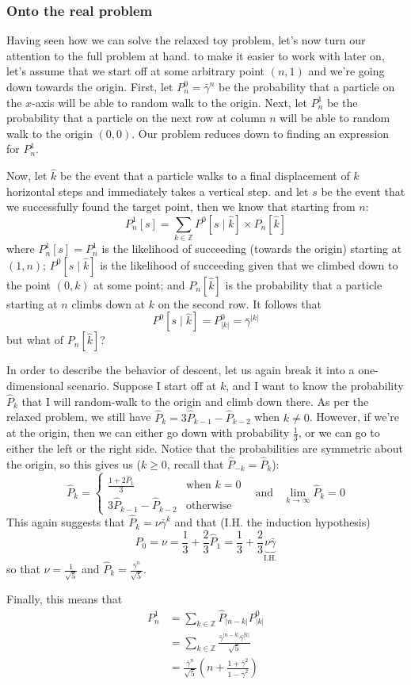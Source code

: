 \subsubsection{Onto the real problem}

Having seen how we can solve the relaxed toy problem, let's now turn our attention to the full problem at hand. to make it easier to work with later on, let's assume that we start off at some arbitrary point $(n,1)$ and we're going down towards the origin. First, let $P^{0}_n = \bar\gamma^n$ be the probability that a particle on the $x$-axis will be able to random walk to the origin. Next, let $P^{1}_n$ be the probability that a particle on the next row at column $n$ will be able to random walk to the origin $(0,0)$. Our problem reduces down to finding an expression for $P^1_n$.


Now, let $\hat k$ be the event that a particle walks to a final displacement of $k$ horizontal steps and immediately takes a vertical step. and let $s$ be the event that we successfully found the target point, then we know that starting from $n$:
$$
P^1_n[s] = \sum_{k \in \mathbb{Z}} P^0[s \mid \hat k] \times P_n[\hat k]
$$
where $P^1_n[s] = P^1_n$ is the likelihood of succeeding (towards the origin) starting at $(1,n)$; $P^0[s \mid \hat k]$ is the likelihood of succeeding given that we climbed down to the point $(0,k)$ at some point; and $P_n[\hat k]$ is the probability that a particle starting at $n$ climbs down at $k$ on the second row. It follows that
$$
P^0[s \mid \hat k] = P^0_{|k|} = \bar\gamma^{|k|}
$$
but what of $P_n[\hat k]$?

In order to describe the behavior of descent, let us again break it into a one-dimensional scenario. Suppose I start off at $k$, and I want to know the probability $\hat P_k$ that I will random-walk to the origin and climb down there. As per the relaxed problem, we still have $\hat P_k = 3 \hat P_{k-1} - \hat P_{k-2}$ when $k \ne 0$. However, if we're at the origin, then we can either go down with probability $\frac13$, or we can go to either the left or the right side. Notice that the probabilities are symmetric about the origin, so this gives us ($k \ge 0$, recall that $\hat P_{-k} = \hat P_k$):
$$
\hat P_k = \begin{cases}
\frac{1 + 2\hat P_1}{3} & \text{when }k = 0 \\
3 \hat P_{k-1} - \hat P_{k-2} & \text{otherwise}
\end{cases} ~~~~ \text{and} ~~~~ \lim_{k\to\infty} \hat P_k = 0
$$
This again suggests that $\hat P_k = \nu \bar\gamma^k$ and that (I.H. the induction hypothesis)
$$
P_0 = \nu = \frac13 + \frac23\hat P_1 = \frac13 + \frac23\underbrace{\nu \bar\gamma}_{\text{I.H.}}
$$
so that $\nu = \frac1{\sqrt{5}}$ and $\hat P_k = \frac{\bar\gamma^n}{\sqrt{5}}$.

Finally, this means that
\begin{align*}
P^1_n &= \sum_{k\in\mathbb{Z}} \hat P_{|n-k|} P^0_{|k|} \\
&=\sum_{k\in\mathbb{Z}} \frac{\bar\gamma^{|n-k|}\bar\gamma^{|k|}}{\sqrt{5}} \\
&= \boxed{\frac{\bar\gamma^n}{\sqrt{5}}\left(n + \frac{1 + \bar\gamma^2}{1 - \bar\gamma^2}\right)}
\end{align*}